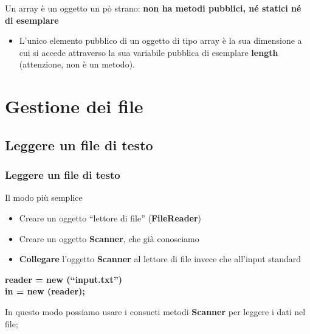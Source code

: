 \begin{frame}
\begin{block}{}
Un array è un oggetto un pò strano: \textbf{non ha metodi pubblici, né statici né di esemplare}
\begin{itemize}
\item L'unico elemento pubblico di un oggetto di tipo array è la sua dimensione a cui si accede attraverso la sua variabile pubblica
di esemplare \textbf{\alert{length}} (attenzione, non è un metodo).
\end{itemize}
\end{block}
\end{frame}

\begin{frame}
\begin{block}{}
\begin{huge}
\begin{center}
\end{center}
\end{huge}
\end{block}
\end{frame}

\section*{Gestione dei file}
\subsection*{Leggere un file di testo}
\begin{frame}
\frametitle{Leggere un file di testo}
\begin{block}{Il modo più semplice}
\begin{itemize}
\item Creare un oggetto ``lettore di file'' (\textbf{FileReader})
\item Creare un oggetto \textbf{Scanner}, che già conosciamo
\item \textbf{\alert{Collegare}} l'oggetto \textbf{Scanner} al lettore di file invece che all'input standard
\end{itemize}
\hspace{0.8cm}\textbf{ reader = new (``\alert{input.txt}'')}\\
\hspace{0.8cm}\textbf{ in = new (\alert{reader});}
\end{block}
\begin{block}{}
In questo modo possiamo usare i consueti metodi \textbf{Scanner} per leggere i dati nel file;
\end{block}
\end{frame}

